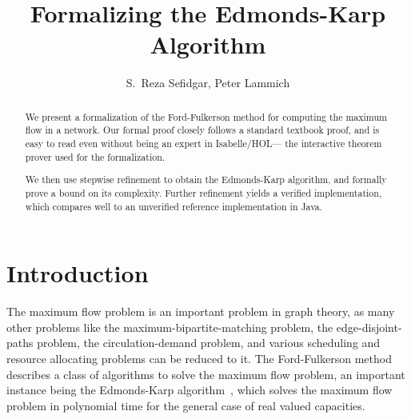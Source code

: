 \documentclass{llncs}
\begin{document}
\title{Formalizing the Edmonds-Karp Algorithm}

\author{S.~Reza Sefidgar, Peter Lammich}


\maketitle
\begin{abstract}
We present a formalization of the Ford-Fulkerson method for computing the maximum flow in a network.
Our formal proof closely follows a standard textbook proof, and is easy to read even without being
an expert in Isabelle/HOL--- the interactive theorem prover used for the formalization.
% 
% 

We then use stepwise refinement to obtain the Edmonds-Karp algorithm, and formally prove a bound on its complexity.
Further refinement yields a verified implementation, which compares well to an unverified reference implementation in Java.



% 
% 
\end{abstract}

\section{Introduction}
The maximum flow problem is an important problem in graph theory, as many other problems like the maximum-bipartite-matching problem, the edge-disjoint-paths problem, the circulation-demand problem, and various scheduling and resource allocating problems can be reduced to it.
The Ford-Fulkerson method~\cite{FF56} describes a class of algorithms to solve the maximum flow problem, an important instance being the Edmonds-Karp algorithm~\cite{EK72},
which solves the maximum flow problem in polynomial time for the general case of real valued capacities.
\end{document}
